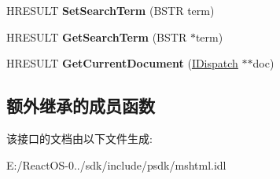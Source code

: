\begin{DoxyCompactItemize}
H\+R\+E\+S\+U\+LT {\bfseries Set\+Search\+Term} (B\+S\+TR term)
\item 
\mbox{\label{interface_i_web_browser_priv2_i_e8_afeaec5561131fa8dd0c686f06cc0ef0d}} 
H\+R\+E\+S\+U\+LT {\bfseries Get\+Search\+Term} (B\+S\+TR $\ast$term)
\item 
\mbox{\label{interface_i_web_browser_priv2_i_e8_a55f908f14c938e9a8bab3d8db53818bd}} 
H\+R\+E\+S\+U\+LT {\bfseries Get\+Current\+Document} (\hyperlink{interface_i_dispatch}{I\+Dispatch} $\ast$$\ast$doc)
\end{DoxyCompactItemize}
\subsection*{额外继承的成员函数}


该接口的文档由以下文件生成\+:\begin{DoxyCompactItemize}
\item 
E\+:/\+React\+O\+S-\/0../sdk/include/psdk/mshtml.\+idl\end{DoxyCompactItemize}
